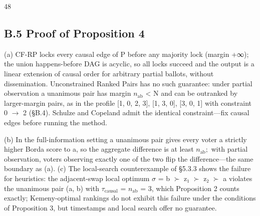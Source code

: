 \documentclass[10pt,twocolumn]{article}
\begin{document}
\begin{thebibliography}{48}
\subsection{B.5 Proof of Proposition 4}
(a) CF-RP locks every causal edge of P before any majority lock (margin +∞); the union happens-before DAG is acyclic, so all locks succeed and the output is a linear extension of causal order for arbitrary partial ballots, without dissemination. Unconstrained Ranked Pairs has no such guarantee: under partial observation a unanimous pair has margin $n_{\mathrm{ab}}$ < N and can be outranked by larger-margin pairs, as in the profile [1, 0, 2, 3], [1, 3, 0], [3, 0, 1] with constraint 0 $\rightarrow$ 2 (§B.4). Schulze and Copeland admit the identical constraint—fix causal edges before running the method.

(b) In the full-information setting a unanimous pair gives every voter a strictly higher Borda score to a, so the aggregate difference is at least $n_{\mathrm{ab}};$ with partial observation, voters observing exactly one of the two flip the difference—the same boundary as (a). (c) The local-search counterexample of §5.3.3 shows the failure for heuristics: the adjacent-swap local optimum $\sigma$ = b $\succ$ z₁ $\succ$ z₂ $\succ$ a violates the unanimous pair (a, b) with $\tau_{\mathrm{causal}}$ = $n_{\mathrm{ab}}$ = 3, which Proposition 2 counts exactly; Kemeny-optimal rankings do not exhibit this failure under the conditions of Proposition 3, but timestamps and local search offer no guarantee.


\end{thebibliography}
\end{document}
